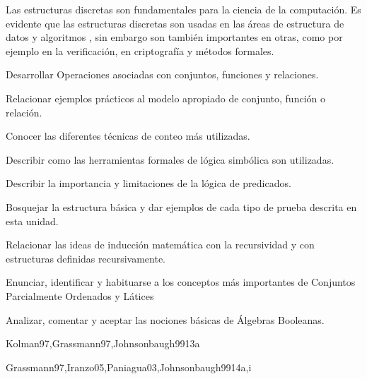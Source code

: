 \begin{syllabus}


\begin{justification}
Las estructuras discretas son fundamentales para la ciencia de la
computación. Es evidente que las estructuras discretas son usadas en
las áreas de estructura de datos y algoritmos , sin embargo son
también importantes en otras, como por ejemplo en la
verificación, en criptografía y métodos formales.
\end{justification}

\begin{goals}
\item Desarrollar Operaciones asociadas con conjuntos, funciones y relaciones.
\item Relacionar ejemplos prácticos al modelo apropiado de conjunto, función o relación.
\item Conocer las diferentes técnicas de conteo más utilizadas.
\item Describir como las herramientas formales de lógica simbólica son utilizadas.
\item Describir la importancia y limitaciones de la lógica de predicados.
\item Bosquejar la estructura básica y dar ejemplos de cada tipo de prueba descrita en esta unidad.
\item Relacionar las ideas de inducción matemática con la recursividad y con estructuras definidas recursivamente.
\item Enunciar, identificar y habituarse a los conceptos más importantes de Conjuntos Parcialmente Ordenados y Látices
\item Analizar, comentar y aceptar las nociones básicas de Álgebras Booleanas.
\end{goals}



\begin{unit}{\DSFunctionsRelationsAndSetsDef}{}{Kolman97,Grassmann97,Johnsonbaugh99}{13}{a}
    \DSFunctionsRelationsAndSetsAllTopics
    \DSFunctionsRelationsAndSetsAllObjectives
\end{unit}

\begin{unit}{\DSBasicLogicDef}{}{Grassmann97,Iranzo05,Paniagua03,Johnsonbaugh99}{14}{a,i}
    \DSBasicLogicAllTopics
    \DSBasicLogicAllObjectives
\end{unit}


\end{syllabus}
